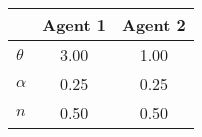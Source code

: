 \begin{tiny}\begin{tabular}{|l|c|c|}
\hline
&\textbf{Agent 1}&\textbf{Agent 2}\\\hline
\textbf{$\theta$}&3.00&1.00\\\hline
\textbf{$\alpha$}&0.25&0.25\\\hline
\textbf{$n$}&0.50&0.50\\\hline
\end{tabular}
\end{tiny}